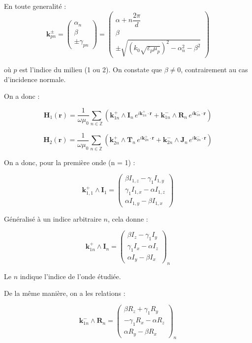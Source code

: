 \documentclass{article}
\begin{document}
En toute generalité : 
\medskip
\[
\mathbf{k}_{pn}^{\pm} =
\begin{pmatrix}
\alpha_n \\
\beta \\
\pm \gamma_{pn}
\end{pmatrix}
=
\begin{pmatrix}
\alpha + n \dfrac{2\pi}{d} \\
\beta \\
\pm \sqrt{\left(k_0 \sqrt{\varepsilon_p \mu_p}\right)^2 - \alpha_n^2 - \beta^2}
\end{pmatrix}
\]

où $p$ est l'indice du milieu (1 ou 2). On constate que $\beta \neq 0$, contrairement au cas d'incidence normale.


On a donc : 

\[
\mathbf{H}_1(\mathbf{r}) = \frac{1}{\omega \mu_0} \sum_{n \in \mathbb{Z}} 
\left( \mathbf{k}_{1n}^{+} \wedge \mathbf{I}_n \, e^{i \mathbf{k}_{1n}^{+} \cdot \mathbf{r}} + 
       \mathbf{k}_{1n}^{-} \wedge \mathbf{R}_n \, e^{i \mathbf{k}_{1n}^{-} \cdot \mathbf{r}} \right)
\]

\[
\mathbf{H}_2(\mathbf{r}) = \frac{1}{\omega \mu_0} \sum_{n \in \mathbb{Z}} 
\left( \mathbf{k}_{2n}^{+} \wedge \mathbf{T}_n \, e^{i \mathbf{k}_{2n}^{+} \cdot \mathbf{r}} + 
       \mathbf{k}_{2n}^{-} \wedge \mathbf{J}_n \, e^{i \mathbf{k}_{2n}^{-} \cdot \mathbf{r}} \right)
\]

On a donc, pour la première onde (n = 1) :

\[
\mathbf{k}_{1,1}^{+} \wedge \mathbf{I}_1 =
\begin{pmatrix}
\beta I_{1,z} - \gamma_1 I_{1,y} \\
\gamma_1 I_{1,x} - \alpha I_{1,z} \\
\alpha I_{1,y} - \beta I_{1,x}
\end{pmatrix}
\]

Généralisé à un indice arbitraire \( n \), cela donne :

\[
\mathbf{k}_{1n}^{+} \wedge \mathbf{I}_n =
\begin{pmatrix}
\beta I_{z} - \gamma_1 I_{y} \\
\gamma_1 I_{x} - \alpha I_{z} \\
\alpha I_{y} - \beta I_{x}
\end{pmatrix}_n
\]

Le \( n \) indique l'indice de l'onde étudiée.

De la même manière, on a les relations :

\[
\mathbf{k}_{1n}^{-} \wedge \mathbf{R}_n =
\begin{pmatrix}
\beta R_{z} + \gamma_1 R_{y} \\
- \gamma_1 R_{x} - \alpha R_{z} \\
\alpha R_{y} - \beta R_{x}
\end{pmatrix}_n
\]
\end{document}
